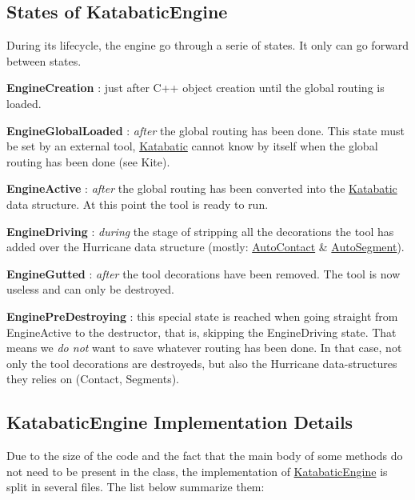 \hypertarget{classKatabatic_1_1KatabaticEngine_secEngineStates}{}\subsection{States of Katabatic\+Engine}\label{classKatabatic_1_1KatabaticEngine_secEngineStates}
During it\textquotesingle{}s lifecycle, the engine go through a serie of states. It only can go forward between states.
\begin{DoxyItemize}
\item {\bfseries Engine\+Creation} \+: just after C++ object creation until the global routing is loaded.
\item {\bfseries Engine\+Global\+Loaded} \+: {\itshape after} the global routing has been done. This state must be set by an external tool, \hyperlink{namespaceKatabatic}{Katabatic} cannot know by itself when the global routing has been done (see Kite).
\item {\bfseries Engine\+Active} \+: {\itshape after} the global routing has been converted into the \hyperlink{namespaceKatabatic}{Katabatic} data structure. At this point the tool is ready to run.
\item {\bfseries Engine\+Driving} \+: {\itshape during} the stage of stripping all the decorations the tool has added over the Hurricane data structure (mostly\+: \hyperlink{classKatabatic_1_1AutoContact}{Auto\+Contact} \& \hyperlink{classKatabatic_1_1AutoSegment}{Auto\+Segment}).
\item {\bfseries Engine\+Gutted} \+: {\itshape after} the tool decorations have been removed. The tool is now useless and can only be destroyed.
\item {\bfseries Engine\+Pre\+Destroying} \+: this special state is reached when going straight from Engine\+Active to the destructor, that is, skipping the Engine\+Driving state. That means we {\itshape do not} want to save whatever routing has been done. In that case, not only the tool decorations are destroyeds, but also the Hurricane data-\/structures they relies on (Contact, Segments).
\end{DoxyItemize}\hypertarget{classKatabatic_1_1KatabaticEngine_secEngineImpl}{}\subsection{Katabatic\+Engine Implementation Details}\label{classKatabatic_1_1KatabaticEngine_secEngineImpl}
Due to the size of the code and the fact that the main body of some methods do not need to be present in the class, the implementation of \hyperlink{classKatabatic_1_1KatabaticEngine}{Katabatic\+Engine} is split in several files. The list below summarize them\+:

